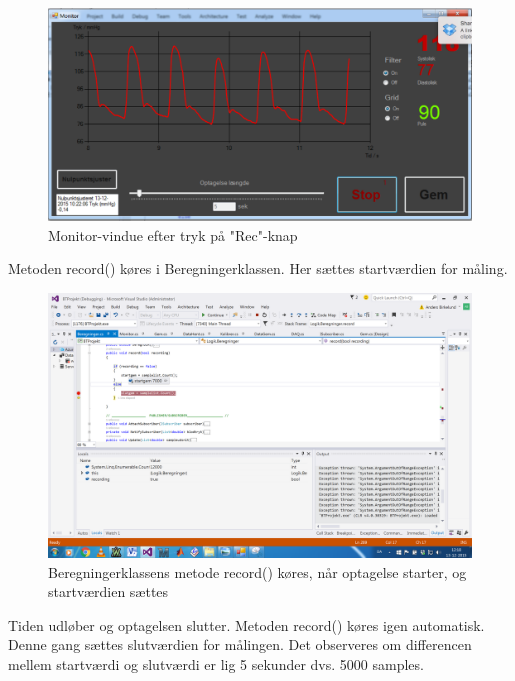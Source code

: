 \begin{figure}[H]
	\centering
	\includegraphics[width=1\textwidth]{Figurer/UC6_ForceRecEnd}
	\caption{Monitor-vindue efter tryk på "Rec"\--knap}
\end{figure}

Metoden record() køres i Beregningerklassen. Her sættes startværdien for måling.

\begin{figure}[H]
	\centering
	\includegraphics[width=1\textwidth]{Figurer/UC6_Record_Start}
	\caption{Beregningerklassens metode record() køres, når optagelse starter, og startværdien sættes}
\end{figure}

Tiden udløber og optagelsen slutter. Metoden record() køres igen automatisk. Denne gang sættes slutværdien for målingen. Det observeres om differencen mellem startværdi og slutværdi er lig 5 sekunder dvs. 5000 samples.

